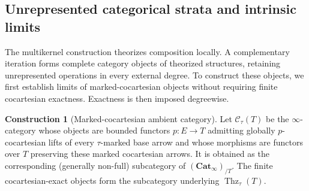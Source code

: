 \documentclass[oneside]{article}
\theoremstyle{plain}
\theoremstyle{definition}
\newtheorem{construction}[theorem]{Construction}
\theoremstyle{remark}
\newcommand{\Cat}{\mathbf{Cat}_{\infty}}
\newcommand{\Thz}{\operatorname{Thz}}
\begin{document}
\subsection{Unrepresented categorical strata and intrinsic limits}
\label{subsec:unrepresented-categorical-strata}

The multikernel construction theorizes composition locally. A
complementary iteration forms complete category objects of theorized
structures, retaining unrepresented operations in every external degree.
To construct these objects, we first establish limits of
marked-cocartesian objects without requiring finite cocartesian
exactness. Exactness is then imposed degreewise.

\begin{construction}[Marked-cocartesian ambient category]
\label{con:marked-cocart-ambient}
Let $\mathscr C_\tau(T)$ be the $\infty$-category whose objects are
bounded functors $p:E\to T$ admitting globally $p$-cocartesian lifts
of every $\tau$-marked base arrow and whose morphisms are functors
over $T$ preserving these marked cocartesian arrows. It is obtained
as the corresponding (generally non-full) subcategory of $(\Cat)_{/T}$.
The finite cocartesian-exact objects form the subcategory underlying
$\Thz_\tau(T)$.
\end{construction}
\end{document}
